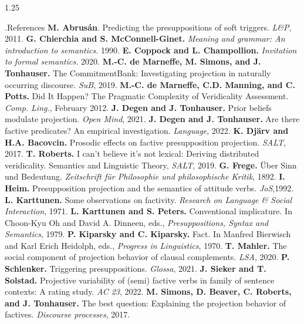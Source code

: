 \documentclass[final, table, cmyk]{beamer}
\newlength{\colwidth}
\begin{document}
\begin{frame}[t]
\begin{columns}[t]
\begin{column}{1.25\colwidth}
\begin{normalbox}{\phantom.\hfill References}
				\textbf{M. Abrusán}. Predicting the presuppositions of soft triggers. \textit{L\&P}, 2011.\quad\textbullet\quad
				\textbf{G. Chierchia and S. McConnell-Ginet.} \textit{Meaning and grammar: An introduction to semantics.} 1990.\quad\textbullet\quad
				\textbf{E. Coppock and L. Champollion.} \textit{Invitation to formal semantics.} 2020.\quad\textbullet\quad
				\textbf{M.-C. de Marneffe, M. Simons, and J. Tonhauser.} The CommitmentBank: Investigating projection in naturally occurring discourse. \textit{SuB}, 2019.\quad\textbullet\quad
				\textbf{M.-C. de Marneffe, C.D. Manning, and C. Potts.} Did It Happen? The Pragmatic Complexity of Veridicality Assessment. \textit{Comp. Ling.}, February 2012.\quad\textbullet\quad
				\textbf{J. Degen and J. Tonhauser.} Prior beliefs modulate projection. \textit{Open Mind}, 2021.\quad\textbullet\quad
				\textbf{J. Degen and J. Tonhauser.} Are there factive predicates? An empirical investigation. \textit{Language}, 2022.\quad\textbullet\quad
				\textbf{K. Djärv and H.A. Bacovcin.} Prosodic effects on factive presupposition projection. \textit{SALT}, 2017.\quad\textbullet\quad
				\textbf{T. Roberts.} I can’t believe it’s not lexical: Deriving distributed veridicality. Semantics and Linguistic Theory, \textit{SALT}, 2019.\quad\textbullet\quad
				\textbf{G. Frege.} Über Sinn und Bedeutung. \textit{Zeitschrift für Philosophie und philosophische Kritik}, 1892.\quad\textbullet\quad
				\textbf{I. Heim.} Presupposition projection and the semantics of attitude verbs. \textit{JoS},1992.\quad\textbullet\quad
				\textbf{L. Karttunen.} Some observations on factivity. \textit{Research on Language \& Social Interaction}, 1971.\quad\textbullet\quad
				\textbf{L. Karttunen and S. Peters.} Conventional implicature. In Choon-Kyu Oh and David A. Dinneen, eds., \textit{Presuppositions, Syntax and Semantics}, 1979.\quad\textbullet\quad
				\textbf{P. Kiparsky and C. Kiparsky.} Fact. In Manfred Bierwisch and Karl Erich Heidolph, eds., \textit{Progress in Linguistics}, 1970.\quad\textbullet\quad
				\textbf{T. Mahler.} The social component of projection behavior of clausal complements. \textit{LSA}, 2020.\quad\textbullet\quad
				\textbf{P. Schlenker.} Triggering presuppositions. \textit{Glossa}, 2021.\quad\textbullet\quad
				\textbf{J. Sieker and T. Solstad.} Projective variability of (semi) factive verbs in family of sentence contexts: A rating study. \textit{AC 23}, 2022.\quad\textbullet\quad
				\textbf{M. Simons, D. Beaver, C. Roberts, and J. Tonhauser.} The best question: Explaining the projection behavior of factives. \textit{Discourse processes}, 2017.\quad\textbullet\quad

\end{normalbox}
\end{column}
\end{columns}
\end{frame}
\end{document}
